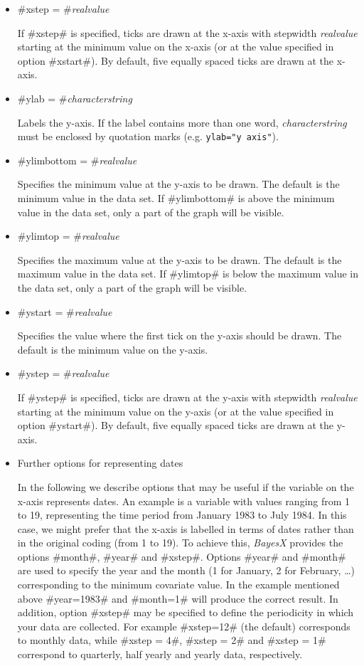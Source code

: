 \begin{itemize}
\item #xstep = #{\em realvalue}

If #xstep# is specified, ticks are drawn at the x-axis with
stepwidth {\em realvalue} starting at the minimum value on the
x-axis (or at the value specified in option #xstart#). By default,
five equally spaced ticks are drawn at the x-axis.

\item #ylab = #{\em characterstring}

Labels the y-axis. If the label contains more than one word, {\em
characterstring} must be enclosed by quotation marks (e.g.
\texttt{ylab="y axis"}).

\item #ylimbottom = #{\em realvalue}

Specifies the minimum value at the y-axis to be drawn. The default
is the minimum value in the data set. If #ylimbottom# is above the
minimum value in the data set, only a part of the  graph will be
visible.

\item #ylimtop = #{\em realvalue}

Specifies the maximum value at the y-axis to be drawn. The default
is the maximum value in the data set. If #ylimtop# is below the
maximum value in the data set, only a part of the  graph will be
visible.

\item #ystart = #{\em realvalue}

Specifies the value where the first tick on the y-axis should be
drawn. The default is the minimum value on the y-axis.

\item #ystep = #{\em realvalue}

If #ystep# is specified,  ticks are drawn at the y-axis with
stepwidth {\em realvalue} starting at the minimum value on the
y-axis (or at the value specified in option #ystart#). By default,
five equally spaced ticks are drawn at the y-axis.

\item Further options for representing dates

In the following we describe options that may be useful if the
variable on the x-axis represents dates. An example is a variable
with values ranging from 1 to 19, representing the time period
from January 1983 to July 1984. In this case, we might prefer that
the x-axis is labelled in terms of dates rather than in the
original coding (from 1 to 19). To achieve this, {\em BayesX}
provides the options #month#, #year# and #xstep#. Options #year#
and #month# are used to specify the year and the month (1 for
January, 2 for February, \dots) corresponding to the minimum
covariate value. In the example mentioned above #year=1983# and
#month=1# will produce the correct result. In addition, option
#xstep# may be specified to define the periodicity in which your
data are collected. For example #xstep=12# (the default)
corresponds to monthly data, while #xstep = 4#, #xstep = 2# and
#xstep = 1# correspond to quarterly, half yearly and yearly data,
respectively.
\end{itemize}


